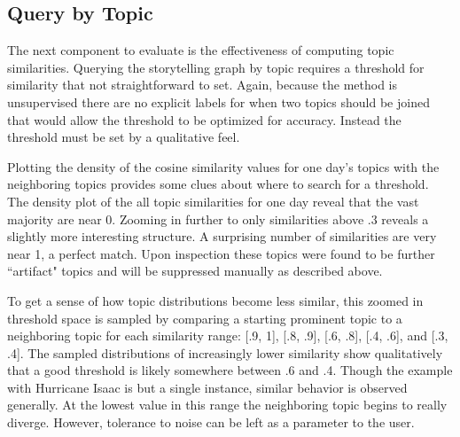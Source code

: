 \documentclass[10pt]{article}
\begin{document}
\subsection {Query by Topic}
The next component to evaluate is the effectiveness of computing topic similarities.  Querying the storytelling graph by topic requires a threshold for similarity that not straightforward to set.  Again, because the method is unsupervised there are no explicit labels for when two topics should be joined that would allow the threshold to be optimized for accuracy.   Instead the threshold must be set by a qualitative feel.

Plotting the density of the cosine similarity values for one day's topics with the neighboring topics provides some clues about where to search for a threshold.  The density plot of the all topic similarities for one day reveal that the vast majority are near 0.  Zooming in further to only similarities above .3 reveals a slightly more interesting structure.  A surprising number of similarities are very near 1, a perfect match.  Upon inspection these topics were found to be further ``artifact" topics and will be suppressed manually as described above.

To get a sense of how topic distributions become less similar, this zoomed in threshold space is sampled by comparing a starting prominent topic to a neighboring topic for each similarity range: [.9, 1], [.8, .9], [.6, .8], [.4, .6], and [.3, .4]. The sampled distributions of increasingly lower similarity show qualitatively that a good threshold is likely somewhere between .6 and .4.  Though the example with Hurricane Isaac is but a single instance, similar behavior is observed generally. At the lowest value in this range the neighboring topic begins to really diverge.  However, tolerance to noise can be left as a parameter to the user. 
\end{document}
